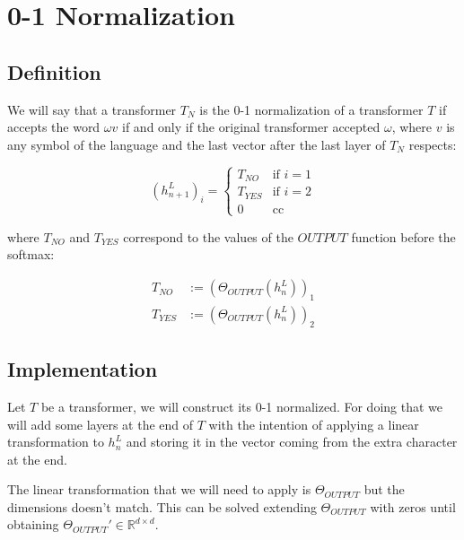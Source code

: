 \section*{0-1 Normalization}

\subsection*{Definition}

We will say that a transformer $T_N$ is the 0-1 normalization of a transformer $T$ if accepts the word $\omega v$ if and only if the original transformer accepted $\omega$, where $v$ is any symbol of the language and the last vector after the last layer of $T_N$ respects:


\begin{equation*}
(h_{n+1}^L)_i =
\begin{cases}
T_{NO} & \text{if } i = 1 \\
T_{YES} & \text{if } i = 2 \\
0 & \text{cc }
\end{cases}
\end{equation*}

where $T_{NO}$ and $T_{YES}$ correspond to the values of the $OUTPUT$ function before the softmax:

\begin{align*}
    T_{NO} &:= (\Theta_{OUTPUT}(h_n^L))_1 \\
    T_{YES} &:= (\Theta_{OUTPUT}(h_n^L))_2 
\end{align*}


\subsection*{Implementation}

Let $T$ be a transformer, we will construct its 0-1 normalized. For doing that we will add some layers at the end of $T$ with the intention of applying a linear transformation to $h_n^L$ and storing it in the vector coming from the extra character at the end.

The linear transformation that we will need to apply is $\Theta_{OUTPUT}$ but the dimensions doesn't match. This can be solved extending $\Theta_{OUTPUT}$ with zeros until obtaining $\Theta_{OUTPUT}' \in \mathbb{R}^{d\times d}$.


